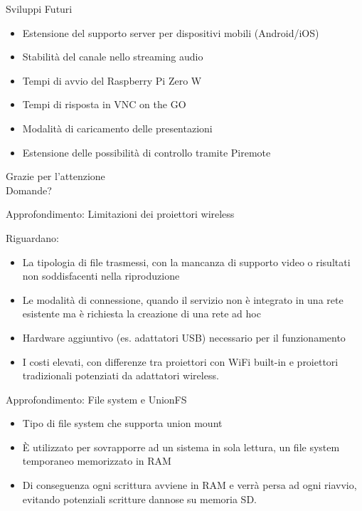 \documentclass{beamer}
\begin{document}
\begin{frame}[fragile]{Sviluppi Futuri}
 \begin{itemize}
     \item Estensione del supporto server per dispositivi mobili (Android/iOS)
     \item Stabilità del canale nello streaming audio
     \item Tempi di avvio del Raspberry Pi Zero W
     \item Tempi di risposta in VNC on the GO
     \item Modalità di caricamento delle presentazioni
     \item Estensione delle possibilità di controllo tramite Piremote

 \end{itemize}
\end{frame}


\begin{frame}[c]

\begin{center}
\LARGE Grazie per l'attenzione\\
Domande?
\end{center}
\end{frame}

\begin{frame}{Approfondimento: Limitazioni dei proiettori wireless}

Riguardano:\newline

\begin{itemize}

\item La tipologia di file trasmessi, con la mancanza di supporto video o risultati non soddisfacenti nella riproduzione
\item Le modalità di connessione, quando il servizio non è integrato in una rete esistente ma è richiesta la creazione di una rete ad hoc
\item Hardware aggiuntivo (es. adattatori USB) necessario per il funzionamento
\item I costi elevati, con differenze tra proiettori con WiFi built-in e proiettori tradizionali potenziati da adattatori wireless.

\end{itemize}
\end{frame}



\begin{frame}{Approfondimento: File system e UnionFS}

\begin{itemize}
\item Tipo di file system che supporta union mount
\item È utilizzato per sovrapporre ad un sistema in sola lettura, un file system temporaneo memorizzato in RAM
\item Di conseguenza ogni scrittura avviene in RAM e verrà persa ad ogni riavvio, evitando potenziali scritture dannose su memoria SD.
\end{itemize}
\end{frame}
\end{document}
